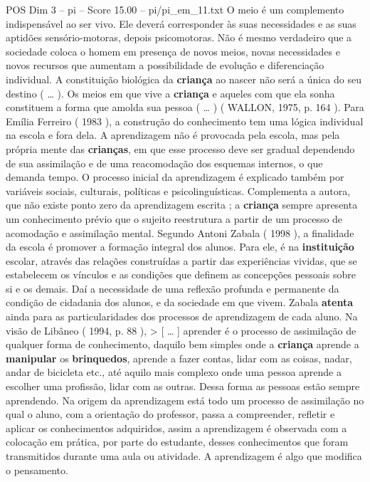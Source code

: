 \begin{textsample}{POS Dim 3 – pi – Score 15.00 – pi/pi\_em\_11.txt}
O meio é um complemento indispensável ao ser vivo.
Ele deverá corresponder às suas necessidades e as suas aptidões sensório-motoras, depois psicomotoras.
Não é mesmo verdadeiro que a sociedade coloca o homem em presença de novos meios, novas necessidades e novos recursos que aumentam a possibilidade de evolução e diferenciação individual.
A constituição biológica da \textbf{criança} ao nascer não será a única do seu destino ( … ).
Os meios em que vive a \textbf{criança} e aqueles com que ela sonha constituem a forma que amolda sua pessoa ( … ) ( WALLON, 1975, p. 164 ).
Para Emília Ferreiro ( 1983 ), a construção do conhecimento tem uma lógica individual na escola e fora dela.
A aprendizagem não é provocada pela escola, mas pela própria mente das \textbf{crianças}, em que esse processo deve ser gradual dependendo de sua assimilação e de uma reacomodação dos esquemas internos, o que demanda tempo.
O processo inicial da aprendizagem é explicado também por variáveis sociais, culturais, políticas e psicolinguísticas.
Complementa a autora, que não existe ponto zero da aprendizagem escrita ; a \textbf{criança} sempre apresenta um conhecimento prévio que o sujeito reestrutura a partir de um processo de acomodação e assimilação mental.
Segundo Antoni Zabala ( 1998 ), a finalidade da escola é promover a formação integral dos alunos.
Para ele, é na \textbf{instituição} escolar, através das relações construídas a partir das experiências vividas, que se estabelecem os vínculos e as condições que definem as concepções pessoais sobre si e os demais.
Daí a necessidade de uma reflexão profunda e permanente da condição de cidadania dos alunos, e da sociedade em que vivem.
Zabala \textbf{atenta} ainda para as particularidades dos processos de aprendizagem de cada aluno.
Na visão de Libâneo ( 1994, p. 88 ), > [ … ] aprender é o processo de assimilação de qualquer forma de conhecimento, daquilo bem simples onde a \textbf{criança} aprende a \textbf{manipular} os \textbf{brinquedos}, aprende a fazer contas, lidar com as coisas, nadar, andar de bicicleta etc., até aquilo mais complexo onde uma pessoa aprende a escolher uma profissão, lidar com as outras.
Dessa forma as pessoas estão sempre aprendendo.
Na origem da aprendizagem está todo um processo de assimilação no qual o aluno, com a orientação do professor, passa a compreender, refletir e aplicar os conhecimentos adquiridos, assim a aprendizagem é observada com a colocação em prática, por parte do estudante, desses conhecimentos que foram transmitidos durante uma aula ou atividade.
A aprendizagem é algo que modifica o pensamento.

\end{textsample}
